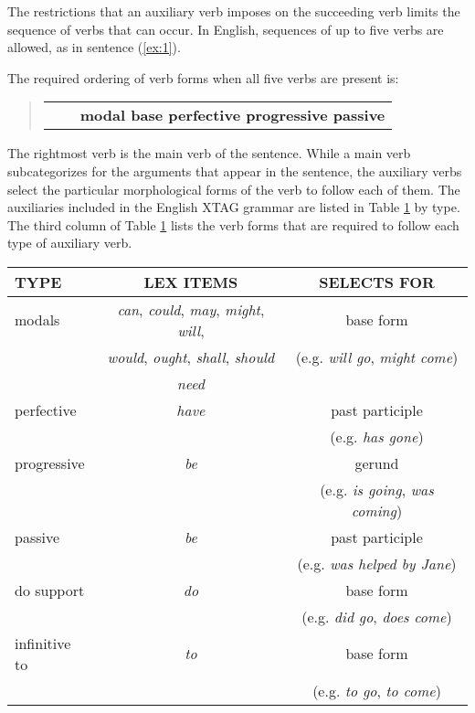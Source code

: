\noindent The restrictions that an auxiliary verb imposes on the succeeding verb limits 
the sequence of verbs that can occur.  In English, sequences of up to five 
verbs are allowed, as in sentence (\ref{ex:1}). 
 
\beginsentences
{}\label{ex:1} 
\endsentences

 
\noindent 
The required ordering of verb forms when all five verbs are present is: 
 
\begin{quote} 
\begin{tabular}{ccl} 
& & {\bf modal base perfective progressive passive} 
\end{tabular} 
\end{quote} 
 
\noindent 
The rightmost verb is the main verb of the sentence.  While a main verb 
subcategorizes for the arguments that appear in the sentence, the auxiliary 
verbs select the particular morphological forms of the verb to follow each of 
them.  The auxiliaries included in the English XTAG grammar are listed in Table 
\ref{aux-table} by type.  The third column of Table \ref{aux-table} lists the 
verb forms that are required to follow each type of auxiliary verb. 
 
\vspace*{0.2in} 
 
\begin{table}[ht] 
\centering 
\begin{tabular}{|l|c|c|}  
\hline 
TYPE&LEX ITEMS&SELECTS FOR\\     
\hline 
modals & {\it can}, {\it could}, {\it may}, {\it might}, {\it will}, & base form\footnotemark 
\\ & {\it would}, {\it ought}, {\it shall}, {\it should} & (e.g. {\it will go}, {\it might come})\\ & {\it need} &\\ 
\hline 
perfective & {\it have} & past participle\\ 
& & (e.g. {\it has gone})\\  
\hline 
progressive & {\it be} & gerund\\ 
& & (e.g. {\it is going}, {\it was coming})\\  
\hline 
passive & {\it be} & past participle\\ 
& & (e.g. {\it was helped by Jane})\\  
\hline 
do support & {\it do} &base form\\ 
& & (e.g. {\it did go}, {\it does come})\\  
\hline 
infinitive to & {\it to} & base form\\ 
& & (e.g. {\it to go}, {\it to come})\\  
\hline 
\end{tabular} 
\begin{rawhtml} <dl> <dt>{Auxiliary Verb Properties <p> </dl> \end{rawhtml}
\label{aux-table} 
\end{table} 
 
